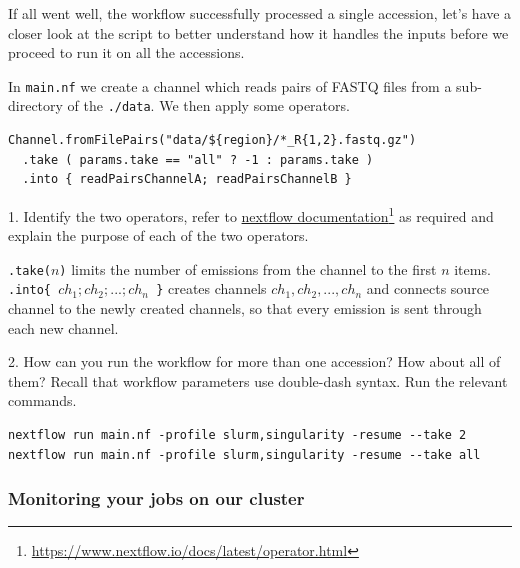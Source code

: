 If all went well, the workflow successfully processed a single accession, 
let's have a closer look at the script to better understand how it handles 
the inputs before we proceed to run it on all the accessions.

\begin{questions}
In \texttt{main.nf} we create a channel which reads pairs of FASTQ files from a sub-directory of the \texttt{./data}. We then apply some operators. 
\begin{verbatim}
Channel.fromFilePairs("data/${region}/*_R{1,2}.fastq.gz")
  .take ( params.take == "all" ? -1 : params.take ) 
  .into { readPairsChannelA; readPairsChannelB } 
\end{verbatim}
1. Identify the two operators, refer to 
\href{https://www.nextflow.io/docs/latest/operator.html}{nextflow documentation}\footnote{\url{https://www.nextflow.io/docs/latest/operator.html}}
as required and explain the purpose of each of the two operators.\\
\begin{answer}
\texttt{.take($n$)} limits the number of emissions from the channel to the first $n$ items. \\
\texttt{.into\{ $ch_1;ch_2;...;ch_n$ \}} creates channels $ch_1,ch_2,...,ch_n$ and connects source channel to the newly created channels, so that every emission is sent through each new channel.
\end{answer}

2. How can you run the workflow for more than one accession? How about all of them? Recall that workflow parameters use double-dash syntax. Run the relevant commands.  
\begin{answer}
\begin{lstlisting}
nextflow run main.nf -profile slurm,singularity -resume --take 2
nextflow run main.nf -profile slurm,singularity -resume --take all
\end{lstlisting}
\end{answer}
%
%
\end{questions}

\subsubsection{Monitoring your jobs on our cluster}

